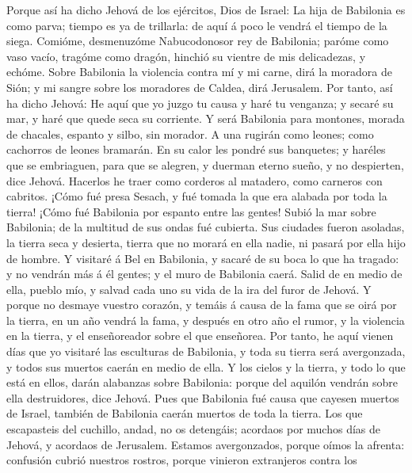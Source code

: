  Porque así ha dicho Jehová de los ejércitos, Dios de
Israel: La hija de Babilonia es como parva; tiempo es ya de trillarla:
de aquí á poco le vendrá el tiempo de la siega.  Comióme,
desmenuzóme Nabucodonosor rey de Babilonia; paróme como vaso vacío,
tragóme como dragón, hinchió su vientre de mis delicadezas, y echóme.
 Sobre Babilonia la violencia contra mí y mi carne, dirá la
moradora de Sión; y mi sangre sobre los moradores de Caldea, dirá
Jerusalem.  Por tanto, así ha dicho Jehová: He aquí que yo
juzgo tu causa y haré tu venganza; y secaré su mar, y haré que quede
seca su corriente.  Y será Babilonia para montones, morada
de chacales, espanto y silbo, sin morador.  A una rugirán
como leones; como cachorros de leones bramarán.  En su
calor les pondré sus banquetes; y haréles que se embriaguen, para que se
alegren, y duerman eterno sueño, y no despierten, dice Jehová.
 Hacerlos he traer como corderos al matadero, como carneros
con cabritos.  ¡Cómo fué presa Sesach, y fué tomada la que
era alabada por toda la tierra! ¡Cómo fué Babilonia por espanto entre
las gentes!  Subió la mar sobre Babilonia; de la multitud
de sus ondas fué cubierta.  Sus ciudades fueron asoladas,
la tierra seca y desierta, tierra que no morará en ella nadie, ni pasará
por ella hijo de hombre.  Y visitaré á Bel en Babilonia, y
sacaré de su boca lo que ha tragado: y no vendrán más á él gentes; y el
muro de Babilonia caerá.  Salid de en medio de ella, pueblo
mío, y salvad cada uno su vida de la ira del furor de Jehová.
 Y porque no desmaye vuestro corazón, y temáis á causa de
la fama que se oirá por la tierra, en un año vendrá la fama, y después
en otro año el rumor, y la violencia en la tierra, y el enseñoreador
sobre el que enseñorea.  Por tanto, he aquí vienen días que
yo visitaré las esculturas de Babilonia, y toda su tierra será
avergonzada, y todos sus muertos caerán en medio de ella. 
Y los cielos y la tierra, y todo lo que está en ellos, darán alabanzas
sobre Babilonia: porque del aquilón vendrán sobre ella destruidores,
dice Jehová.  Pues que Babilonia fué causa que cayesen
muertos de Israel, también de Babilonia caerán muertos de toda la
tierra.  Los que escapasteis del cuchillo, andad, no os
detengáis; acordaos por muchos días de Jehová, y acordaos de Jerusalem.
 Estamos avergonzados, porque oímos la afrenta: confusión
cubrió nuestros rostros, porque vinieron extranjeros contra los
